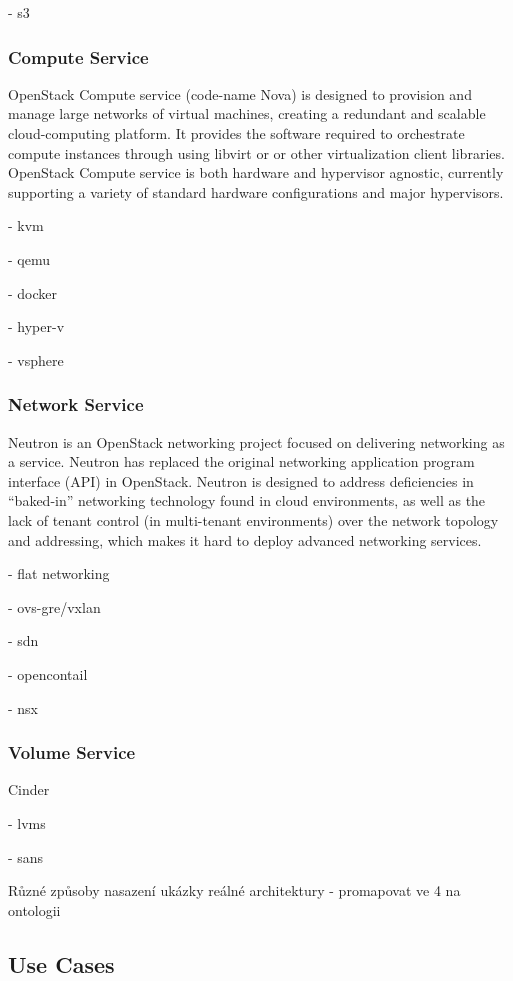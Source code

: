 - s3

\subsubsection{Compute Service}

OpenStack Compute service (code-name Nova) is designed to provision and manage large networks of virtual machines, creating a redundant and scalable cloud-computing platform.  It provides the software required to orchestrate compute instances through using libvirt or or other virtualization client libraries. OpenStack Compute service is both hardware and hypervisor agnostic, currently supporting a variety of standard hardware configurations and major hypervisors.

- kvm

- qemu

- docker

- hyper-v

- vsphere

\subsubsection{Network Service}

Neutron is an OpenStack networking project focused on delivering networking as a service. Neutron has replaced the original networking application program interface (API) in OpenStack. Neutron is designed to address deficiencies in “baked-in” networking technology found in cloud environments, as well as the lack of tenant control (in multi-tenant environments) over the network topology and addressing, which makes it hard to deploy advanced networking services.


- flat networking

- ovs-gre/vxlan

- sdn

  - opencontail
  
  - nsx

\subsubsection{Volume Service}

Cinder

- lvms

- sans

Různé způsoby nasazení ukázky reálné architektury - promapovat ve 4 na ontologii

\subsection{Use Cases}

